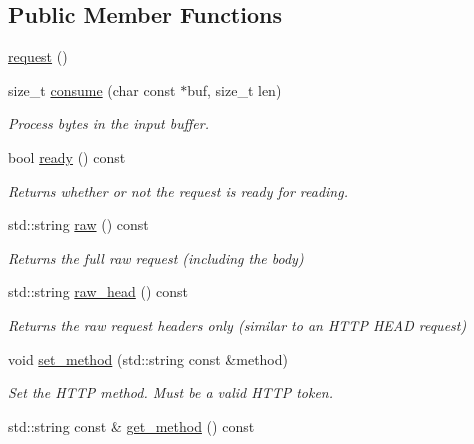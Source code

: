 \subsection*{Public Member Functions}
\begin{DoxyCompactItemize}
\item 
\hyperlink{classwebsocketpp_1_1http_1_1parser_1_1request_a006c941a421dd855b7ae6b40ca855e97}{request} ()
\item 
size\+\_\+t \hyperlink{classwebsocketpp_1_1http_1_1parser_1_1request_abd9cae6f44634d62253d806d982ab1d6}{consume} (char const $\ast$buf, size\+\_\+t len)
\begin{DoxyCompactList}\small\item\em Process bytes in the input buffer. \end{DoxyCompactList}\item 
bool \hyperlink{classwebsocketpp_1_1http_1_1parser_1_1request_a5981112a0693ab505c1f1cb457debffe}{ready} () const 
\begin{DoxyCompactList}\small\item\em Returns whether or not the request is ready for reading. \end{DoxyCompactList}\item 
std\+::string \hyperlink{classwebsocketpp_1_1http_1_1parser_1_1request_adf8887f6b5fb53a650185cd2589be0e8}{raw} () const 
\begin{DoxyCompactList}\small\item\em Returns the full raw request (including the body) \end{DoxyCompactList}\item 
std\+::string \hyperlink{classwebsocketpp_1_1http_1_1parser_1_1request_a06b5abf41d4591fbe746867b12abe5e4}{raw\+\_\+head} () const 
\begin{DoxyCompactList}\small\item\em Returns the raw request headers only (similar to an H\+T\+T\+P H\+E\+A\+D request) \end{DoxyCompactList}\item 
void \hyperlink{classwebsocketpp_1_1http_1_1parser_1_1request_af1f0c6944c6cbbaf6db20e5830333eaf}{set\+\_\+method} (std\+::string const \&method)
\begin{DoxyCompactList}\small\item\em Set the H\+T\+T\+P method. Must be a valid H\+T\+T\+P token. \end{DoxyCompactList}\item 
std\+::string const \& \hyperlink{classwebsocketpp_1_1http_1_1parser_1_1request_a82932eb70c5fa7a7b63c08cf7d86ae84}{get\+\_\+method} () const 

\end{DoxyCompactItemize}
